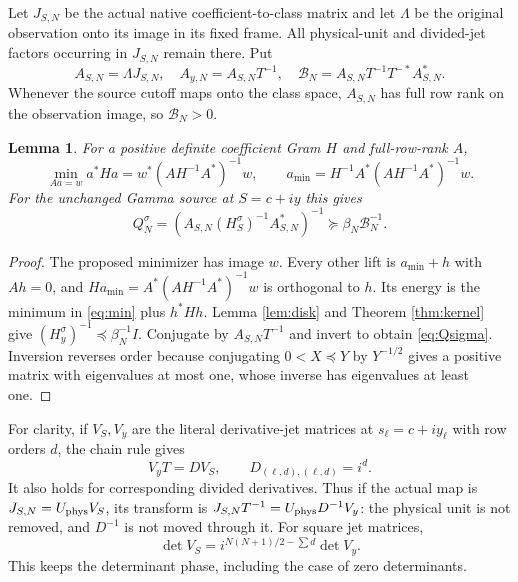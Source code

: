 \documentclass[11pt]{article}
\newtheorem{lemma}[theorem]{Lemma}
\begin{document}
Let $J_{S,N}$ be the actual native coefficient-to-class matrix and let
$\Lambda$ be the original observation onto its image in its fixed frame.
All physical-unit and divided-jet factors occurring in $J_{S,N}$ remain
there.  Put
\begin{equation}\label{eq:A}
 A_{S,N}=\Lambda J_{S,N},\quad
 A_{y,N}=A_{S,N}T^{-1},\quad
 \mathcal B_N=A_{S,N}T^{-1}T^{-*}A_{S,N}^*.
\end{equation}
Whenever the source cutoff maps onto the class space, $A_{S,N}$ has full
row rank on the observation image, so $\mathcal B_N>0$.

\begin{lemma}\label{lem:min}
For a positive definite coefficient Gram $H$ and full-row-rank $A$,
\begin{equation}\label{eq:min}
 \min_{Aa=w}a^*Ha=w^*(AH^{-1}A^*)^{-1}w,\qquad
 a_{\min}=H^{-1}A^*(AH^{-1}A^*)^{-1}w.
\end{equation}
For the unchanged Gamma source at $S=c+iy$ this gives
\begin{equation}\label{eq:Qsigma}
 \boxed{Q_N^\sigma=(A_{S,N}(H_S^\sigma)^{-1}A_{S,N}^*)^{-1}
 \succeq\beta_N\mathcal B_N^{-1}.}
\end{equation}
\end{lemma}
\begin{proof}
The proposed minimizer has image $w$.  Every other lift is $a_{\min}+h$
with $Ah=0$, and $Ha_{\min}=A^*(AH^{-1}A^*)^{-1}w$ is orthogonal
to $h$.  Its energy is the minimum in \eqref{eq:min} plus $h^*Hh$.
Lemma \ref{lem:disk} and Theorem \ref{thm:kernel} give
$(H_y^\sigma)^{-1}\preceq\beta_N^{-1}I$.  Conjugate by
$A_{S,N}T^{-1}$ and invert to obtain \eqref{eq:Qsigma}.  Inversion
reverses order because conjugating $0<X\preceq Y$ by $Y^{-1/2}$
gives a positive matrix with eigenvalues at most one, whose inverse has
eigenvalues at least one.
\end{proof}

For clarity, if $V_S,V_y$ are the literal derivative-jet matrices at
$s_\ell=c+iy_\ell$ with row orders $d$, the chain rule gives
\begin{equation}\label{eq:jets}
 V_yT=D V_S,\qquad D_{(\ell,d),(\ell,d)}=i^d.
\end{equation}
It also holds for corresponding divided derivatives.  Thus if the
actual map is $J_{S,N}=U_{\rm phys}V_S$, its transform is
$J_{S,N}T^{-1}=U_{\rm phys}D^{-1}V_y$: the physical unit is not removed,
and $D^{-1}$ is not moved through it.  For square jet matrices,
\[
 \det V_S=i^{N(N+1)/2-\sum d}\det V_y.
\]
This keeps the determinant phase, including the case of zero determinants.
\end{document}
